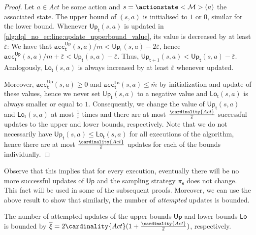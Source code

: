\documentclass{article}
\newcommand{\MDP}{\mathcal{M}}
\newcommand{\Actions}{Act}
\newcommand{\strategy}{\pi}
\newcommand{\upperbound}{\mathsf{Up}}
\newcommand{\lowerbound}{\mathsf{Lo}}
\newcommand{\updatestep}{{\overline{\varepsilon}}}
\newcommand{\delay}{{\overline{m}}}
\newcommand{\updatecount}{{\overline{\xi}}}
\newcommand{\acc}{\texttt{acc}}
\newcommand{\algostep}{\mathsf{t}}
\newcommand{\algoepisode}{\mathsf{e}}
\begin{document}
\begin{proof}
	Let $a \in \Actions$ be some action and $s = \actionstate<\MDP>(a)$ the associated state.
	The upper bound of $(s, a)$ is initialised to $1$ or $0$, similar for the lower bound.
	Whenever $\upperbound_\algostep(s, a)$ is updated in \cref{alg:dql_no_ec:line:update_upperbound_value}, its value is decreased by at least $\updatestep$:
	We have that $\acc_\algostep^\upperbound(s, a) / m < \upperbound_\algostep(s, a) - 2 \updatestep$, hence $\acc_\algostep^\upperbound(s, a) / m + \updatestep < \upperbound_\algostep(s, a) - \updatestep$.
	Thus, $\upperbound_{\algostep+1}(s, a) < \upperbound_\algostep(s, a) - \updatestep$.
	Analogously, $\lowerbound_\algostep(s, a)$ is always increased by at least $\updatestep$ whenever updated.

	Moreover, $\acc_\algostep^\upperbound(s, a) \geq 0$ and $\acc_\algostep^\lowerbound(s, a) \leq \delay$ by initialization and update of these values, hence we never set $\upperbound_\algostep(s, a)$ to a negative value and $\lowerbound_\algostep(s, a)$ is always smaller or equal to $1$.
	Consequently, we change the value of $\upperbound_\algostep(s, a)$ and $\lowerbound_\algostep(s, a)$ at most $\frac{1}{\updatestep}$ times and there are at most $\frac{\cardinality{\Actions}}{\updatestep}$ successful updates to the upper and lower bounds, respectively.
	Note that we do not necessarily have $\upperbound_\algostep(s, a) \leq \lowerbound_\algostep(s, a)$ for all executions of the algorithm, hence there are at most $\frac{\cardinality{\Actions}}{\updatestep}$ updates for each of the bounds individually. 
\end{proof}
Observe that this implies that for every execution, eventually there will be no more successful updates of $\upperbound$ and the sampling strategy $\strategy_\algoepisode$ does not change.
This fact will be used in some of the subsequent proofs.
Moreover, we can use the above result to show that similarly, the number of \emph{attempted} updates is bounded.
\begin{lemma} \label{stm:dql_no_ec:attempted_update_count}
	The number of attempted updates of the upper bounds $\upperbound$ and lower bounds $\lowerbound$ is bounded by $\updatecount = 2 \cardinality{\Actions} (1 + \frac{\cardinality{\Actions}}{\updatestep})$, respectively.
\end{lemma}
\end{document}
